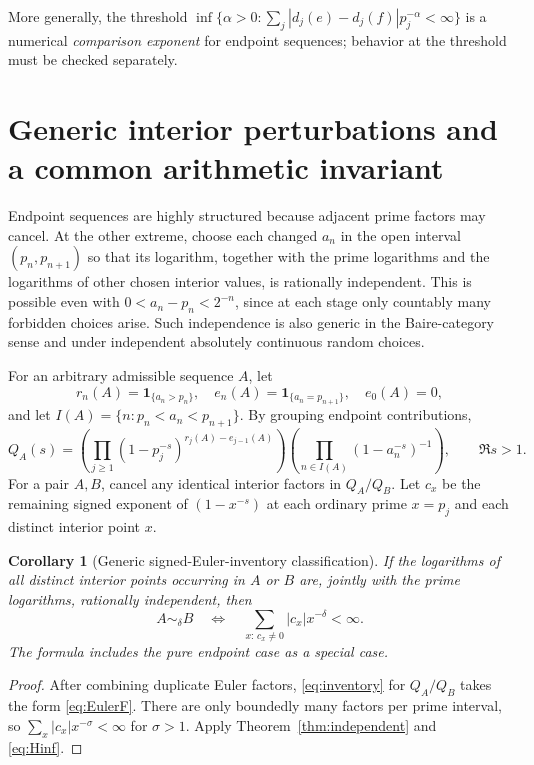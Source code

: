 \documentclass[12pt,letterpaper]{article}
\newtheorem{corollary}[theorem]{Corollary}
\numberwithin{equation}{section}
\theoremstyle{remark}
\begin{document}
More generally, the threshold $\inf\{\alpha>0:\sum_j|d_j(e)-d_j(f)|p_j^{-\alpha}<\infty\}$ is a numerical \emph{comparison exponent} for endpoint sequences; behavior at the threshold must be checked separately.

\section{Generic interior perturbations and a common arithmetic invariant}\label{sec:generic}
Endpoint sequences are highly structured because adjacent prime factors may cancel. At the other extreme, choose each changed $a_n$ in the open interval $(p_n,p_{n+1})$ so that its logarithm, together with the prime logarithms and the logarithms of other chosen interior values, is rationally independent. This is possible even with $0<a_n-p_n<2^{-n}$, since at each stage only countably many forbidden choices arise. Such independence is also generic in the Baire-category sense and under independent absolutely continuous random choices.

For an arbitrary admissible sequence $A$, let
\[
 r_n(A)=\mathbf 1_{\{a_n>p_n\}},\quad
 e_n(A)=\mathbf1_{\{a_n=p_{n+1}\}},\quad e_0(A)=0,
\]
and let $I(A)=\{n:p_n<a_n<p_{n+1}\}$. By grouping endpoint contributions,
\begin{equation}\label{eq:inventory}
 Q_A(s)=\left(\prod_{j\ge1}(1-p_j^{-s})^{r_j(A)-e_{j-1}(A)}\right)
 \left(\prod_{n\in I(A)}(1-a_n^{-s})^{-1}\right),\qquad\Re s>1.
\end{equation}
For a pair $A,B$, cancel any identical interior factors in $Q_A/Q_B$. Let $c_x$ be the remaining signed exponent of $(1-x^{-s})$ at each ordinary prime $x=p_j$ and each distinct interior point $x$.

\begin{corollary}[Generic signed-Euler-inventory classification]\label{cor:inventory}
If the logarithms of all distinct interior points occurring in $A$ or $B$ are, jointly with the prime logarithms, rationally independent, then
\begin{equation}\label{eq:inventorycriterion}
 \boxed{A\sim_\delta B\quad\Longleftrightarrow\quad
 \sum_{x:\,c_x\ne0}|c_x|x^{-\delta}<\infty.}
\end{equation}
The formula includes the pure endpoint case as a special case.
\end{corollary}
\begin{proof}
After combining duplicate Euler factors, \eqref{eq:inventory} for $Q_A/Q_B$ takes the form \eqref{eq:EulerF}. There are only boundedly many factors per prime interval, so $\sum_x|c_x|x^{-\sigma}<\infty$ for $\sigma>1$. Apply Theorem~\ref{thm:independent} and \eqref{eq:Hinf}.
\end{proof}
\end{document}
